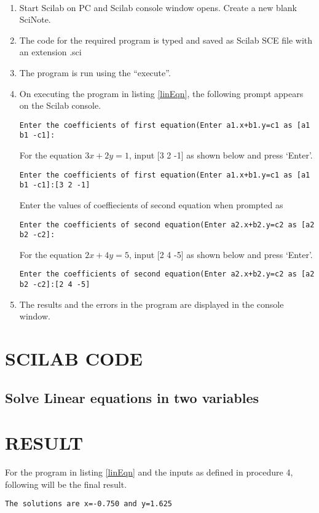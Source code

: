 \paragraph{}
\begin{enumerate}
\item
Start Scilab on PC and Scilab console window opens. Create a new blank SciNote.
\item
The code for the required program is typed and saved as Scilab SCE file with an extension .sci
\item
The program is run using the “execute”.
\item
On executing the program in listing \ref{linEqn}, the following prompt appears on the Scilab console.

\begin{lstlisting}[numbers=none]
Enter the coefficients of first equation(Enter a1.x+b1.y=c1 as [a1 b1 -c1]:
\end{lstlisting}

For the equation $3x+2y=1$, input [3 2 -1] as shown below and press  `Enter'.
\begin{lstlisting}[numbers=none]
Enter the coefficients of first equation(Enter a1.x+b1.y=c1 as [a1 b1 -c1]:[3 2 -1] 
\end{lstlisting}
Enter the values of coeffiecients of second equation when prompted as
\begin{lstlisting}[numbers=none]
Enter the coefficients of second equation(Enter a2.x+b2.y=c2 as [a2 b2 -c2]:
\end{lstlisting}
For the equation $2x+4y=5$, input [2 4 -5] as shown below and press  `Enter'.
\begin{lstlisting}[numbers=none]
Enter the coefficients of second equation(Enter a2.x+b2.y=c2 as [a2 b2 -c2]:[2 4 -5]
\end{lstlisting}
\item
The results and the errors in the program are displayed in the console window.
\end{enumerate}

\section*{SCILAB CODE}
\subsection*{Solve Linear equations in two variables}





\section*{RESULT}

For the program in listing \ref{linEqn} and the inputs as defined in procedure 4, following will be the final result.
\begin{lstlisting}[numbers=none]
The solutions are x=-0.750 and y=1.625
\end{lstlisting}




